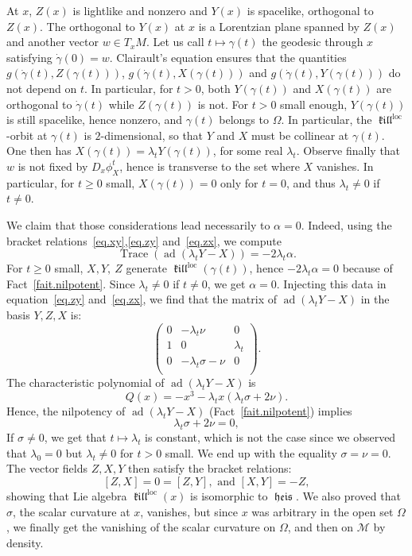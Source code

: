 \documentclass[11pt]{article}
\theoremstyle{definition}
\numberwithin{equation}{section}
\numberwithin{figure}{section}
\numberwithin{table}{section}
\DeclareMathOperator{\ad}{ad}
\DeclareMathOperator{\Trace}{Trace}
\DeclareMathOperator{\loc}{loc}
\DeclareMathOperator{\kil}{{\mathfrak{kill}}}
\newcommand{\kiloc}{\kil^{\loc}}
\DeclareMathOperator{\heis}{{\mathfrak{heis}}}
\newcommand{\calm}{\mathcal{M}}
\begin{document}
At $x$, $Z(x)$ is lightlike and nonzero and $Y(x)$ is spacelike, orthogonal to $Z(x)$. The orthogonal to $Y(x)$ at $x$ is a Lorentzian plane spanned by $Z(x)$ and another vector $w \in T_xM$. Let us call $t \mapsto \gamma(t)$ the geodesic through $x$ satisfying $\dot{\gamma}(0)=w$. Clairault's equation ensures that the quantities $g(\dot{\gamma}(t),Z(\gamma(t)))$, $g(\dot{\gamma}(t),X(\gamma(t)))$ and $g(\dot{\gamma}(t),Y(\gamma(t)))$ do not depend on $t$. In particular, for $t>0$, both $Y(\gamma(t))$ and $X(\gamma(t))$ are orthogonal to $\dot{\gamma}(t)$ while $Z(\gamma(t))$ is not. For $t>0$ small enough, $Y(\gamma(t))$ is still spacelike, hence nonzero, and $\gamma(t)$ belongs to $\Omega$. In particular, the $\kiloc$-orbit at $\gamma(t)$ is $2$-dimensional, so that $Y$ and $X$ must be collinear at $\gamma(t)$. One then has $X(\gamma(t))=\lambda_t Y(\gamma(t))$, for some real $\lambda_t$. Observe finally that $w$ is not fixed by $D_x\phi_X^t$, hence is transverse to the set where $X$ vanishes. In particular, for $t \geq 0$ small, $X(\gamma(t))=0$ only for $t = 0$, and thus $\lambda_t \not =0$ if $t \not =0$.


We claim that those considerations lead necessarily to $\alpha=0$. Indeed, using the bracket relations~\eqref{eq.xy},\eqref{eq.zy} and~\eqref{eq.zx}, we compute
\[
\Trace(\ad(\lambda_t Y - X))=-2 \lambda_t \alpha.
\]
For $t \geq 0$ small, $X,Y,\ Z$ generate $\kiloc(\gamma(t))$, hence $-2 \lambda_t \alpha=0$ because of Fact~\ref{fait.nilpotent}. Since $\lambda_t \not = 0$ if $t \not =0$, we get $\alpha=0$. Injecting this data in equation~\eqref{eq.zy} and~\eqref{eq.zx}, we find that the matrix of $\ad(\lambda_t Y - X)$ in the basis $Y,Z,X$ is:
\[
\begin{pmatrix}
0 & -\lambda_t \nu &0\\
1 & 0 & \lambda_t\\
0 & -\lambda_t \sigma -\nu & 0\\
\end{pmatrix}.
\]
The characteristic polynomial of $\ad(\lambda_t Y - X)$ is
\[
Q(x)=-x^3-\lambda_t x(\lambda_t \sigma + 2 \nu).
\]
Hence, the nilpotency of $\ad(\lambda_t Y - X)$ (Fact~\ref{fait.nilpotent}) implies
\begin{equation}\label{eq.relation}
\lambda_t \sigma + 2 \nu=0,
\end{equation}
If $\sigma \not =0$, we get that $t \mapsto \lambda_t$ is constant, which is not the case since we observed that $\lambda_0=0$ but $\lambda_t \not =0$ for $t>0$ small. We end up with the equality $\sigma=\nu=0$. The vector fields $Z,X,Y$ then satisfy the bracket relations:
\[
[Z,X]=0=[Z,Y], \text{ and } [X,Y]=-Z,
\]
showing that Lie algebra $\kiloc(x)$ is isomorphic to $\heis$. We also proved that $\sigma$, the scalar curvature at $x$, vanishes, but since $x$ was arbitrary in the open set $\Omega$, we finally get the vanishing of the scalar curvature on $\Omega$, and then on $\calm$ by density.
\end{document}
